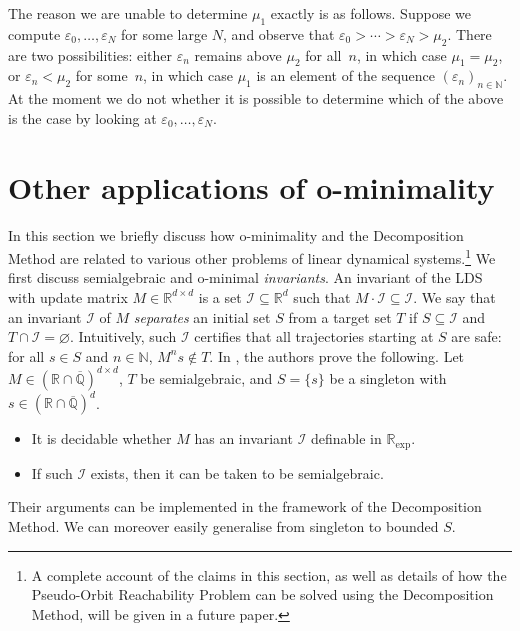 \documentclass[a4paper,UKenglish,cleveref]{lipics-v2021}
\newcommand{\nat}{\mathbb{N}}
\newcommand{\rel}{\mathbb{R}}
\newcommand{\rat}{\mathbb{Q}}
\newcommand{\alg}{\overline{\rat}}
\newcommand{\ralg}{\rel \cap \alg}
\newcommand{\rexp}{\rel_{\exp}}
\newcommand{\Ical}{\mathcal{I}}
\begin{document}
The reason we are unable to determine $\mu_1$ exactly is as follows.
Suppose we compute $\varepsilon_0, \ldots, \varepsilon_N$ for some large $N$, and observe that $\varepsilon_0 > \cdots > \varepsilon_N > \mu_2$.
There are two possibilities: either $\varepsilon_n$ remains above $\mu_2$ for all~$n$, in which case $\mu_1 = \mu_2$, or $\varepsilon_n < \mu_2$ for some~$n$, in which case $\mu_1$ is an element of the sequence $(\varepsilon_n)_{n\in\nat}$.
At the moment we do not whether it is possible to determine which of the above is the case by looking at $\varepsilon_0, \ldots, \varepsilon_N$.
 
\section{Other applications of o-minimality}
\label{sec::other-applications}
In this section we briefly discuss how o-minimality and the Decomposition Method are related to various other problems of linear dynamical systems.\footnote{A complete account of the claims in this section, as well as details of how the Pseudo-Orbit Reachability Problem can be solved using the Decomposition Method, will be given in a future paper.}
We first discuss semialgebraic and o-minimal \emph{invariants}.
An invariant of the LDS with update matrix $M \in \rel^{d\times d}$ is a set $\Ical \subseteq \rel^d$ such that $M \cdot \Ical \subseteq \Ical$.
We say that an invariant $\Ical$ of $M$ \emph{separates} an initial set $S$ from a target set $T$ if $S \subseteq \Ical$ and $T \cap \Ical = \varnothing$.
Intuitively, such $\Ical$ certifies that all trajectories starting at $S$ are safe: for all $s \in S$ and $n \in \nat$, $M^ns \notin T$.
In \cite{almagor2022minimal}, the authors prove the following.
Let $M \in (\ralg)^{d\times d}$, $T$ be semialgebraic, and $S = \{s\}$ be a singleton with $s \in (\ralg)^d$.
\begin{itemize}
	\item It is decidable whether $M$ has an invariant $\Ical$ definable in $\rexp$.
	\item If such $\Ical$ exists, then it can be taken to be semialgebraic.
\end{itemize}
Their arguments can be implemented in the framework of the Decomposition Method.
We can moreover easily generalise from singleton to bounded $S$.
\end{document}
